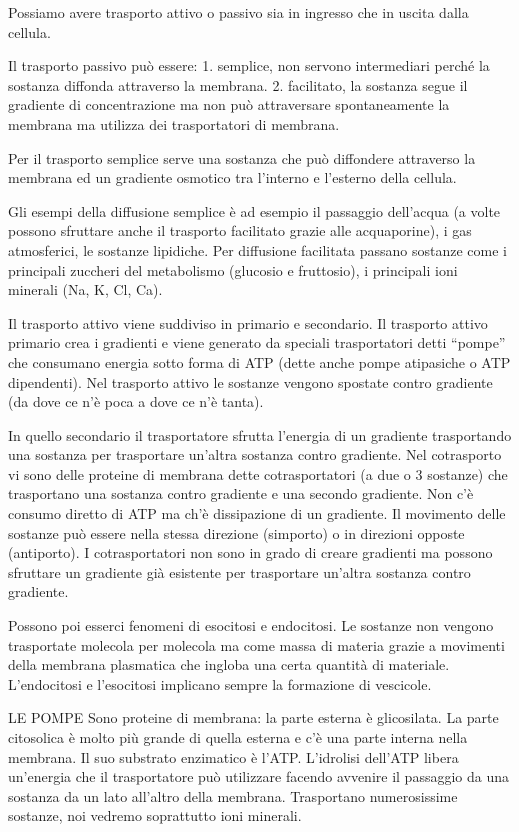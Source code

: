 \documentclass[]{article}
\begin{document}
Possiamo avere trasporto attivo o passivo sia in ingresso che in uscita
dalla cellula.

Il trasporto passivo può essere: 1. semplice, non servono intermediari
perché la sostanza diffonda attraverso la membrana. 2. facilitato, la
sostanza segue il gradiente di concentrazione ma non può attraversare
spontaneamente la membrana ma utilizza dei trasportatori di membrana.

Per il trasporto semplice serve una sostanza che può diffondere
attraverso la membrana ed un gradiente osmotico tra l'interno e
l'esterno della cellula.

Gli esempi della diffusione semplice è ad esempio il passaggio
dell'acqua (a volte possono sfruttare anche il trasporto facilitato
grazie alle acquaporine), i gas atmosferici, le sostanze lipidiche. Per
diffusione facilitata passano sostanze come i principali zuccheri del
metabolismo (glucosio e fruttosio), i principali ioni minerali (Na, K,
Cl, Ca).

Il trasporto attivo viene suddiviso in primario e secondario. Il
trasporto attivo primario crea i gradienti e viene generato da speciali
trasportatori detti ``pompe'' che consumano energia sotto forma di ATP
(dette anche pompe atipasiche o ATP dipendenti). Nel trasporto attivo le
sostanze vengono spostate contro gradiente (da dove ce n'è poca a dove
ce n'è tanta).

In quello secondario il trasportatore sfrutta l'energia di un gradiente
trasportando una sostanza per trasportare un'altra sostanza contro
gradiente. Nel cotrasporto vi sono delle proteine di membrana dette
cotrasportatori (a due o 3 sostanze) che trasportano una sostanza contro
gradiente e una secondo gradiente. Non c'è consumo diretto di ATP ma
ch'è dissipazione di un gradiente. Il movimento delle sostanze può
essere nella stessa direzione (simporto) o in direzioni opposte
(antiporto). I cotrasportatori non sono in grado di creare gradienti ma
possono sfruttare un gradiente già esistente per trasportare un'altra
sostanza contro gradiente.

Possono poi esserci fenomeni di esocitosi e endocitosi. Le sostanze non
vengono trasportate molecola per molecola ma come massa di materia
grazie a movimenti della membrana plasmatica che ingloba una certa
quantità di materiale. L'endocitosi e l'esocitosi implicano sempre la
formazione di vescicole.

LE POMPE Sono proteine di membrana: la parte esterna è glicosilata. La
parte citosolica è molto più grande di quella esterna e c'è una parte
interna nella membrana. Il suo substrato enzimatico è l'ATP. L'idrolisi
dell'ATP libera un'energia che il trasportatore può utilizzare facendo
avvenire il passaggio da una sostanza da un lato all'altro della
membrana. Trasportano numerosissime sostanze, noi vedremo soprattutto
ioni minerali.
\end{document}
